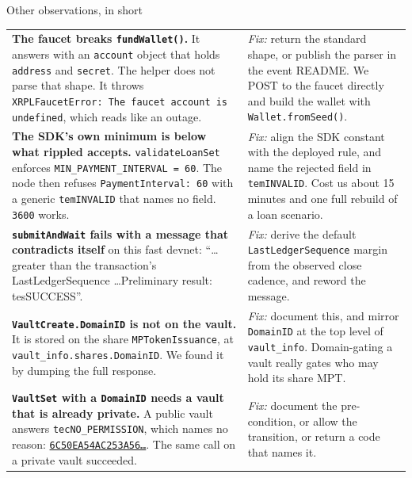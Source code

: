 \documentclass[10pt,a4paper]{article}
\newcommand{\txs}[2]{\href{https://custom.xrpl.org/lending-hackathon.dev.ripplex.io:51233/transactions/#1}{\texttt{\fontsize{7.4}{9}\selectfont #2\ldots}}}
\begin{document}
{\displayfont\fontsize{13}{16}\selectfont\color{forest}Other observations, in short\par}
\nopagebreak\vspace{1mm}
\nopagebreak\noindent\begin{longtable}{@{}>{\fontsize{8.6}{11}\selectfont\RaggedRight}p{58mm}@{\hspace{5mm}}>{\fontsize{8.6}{11}\selectfont\RaggedRight}p{105mm}@{}}
\textbf{The faucet breaks \texttt{fundWallet()}.} It answers with an \texttt{account} object that holds \texttt{address} and \texttt{secret}. The helper does not parse that shape. It throws \texttt{XRPLFaucetError: The faucet account is undefined}, which reads like an outage. & \emph{Fix:} return the standard shape, or publish the parser in the event README. We POST to the faucet directly and build the wallet with \texttt{Wallet.fromSeed()}.\\[3pt]
\textbf{The SDK's own minimum is below what rippled accepts.} \texttt{validateLoanSet} enforces \texttt{MIN\_PAYMENT\_INTERVAL = 60}. The node then refuses \texttt{PaymentInterval: 60} with a generic \texttt{temINVALID} that names no field. \texttt{3600} works. & \emph{Fix:} align the SDK constant with the deployed rule, and name the rejected field in \texttt{temINVALID}. Cost us about 15 minutes and one full rebuild of a loan scenario.\\[3pt]
\textbf{\texttt{submitAndWait} fails with a message that contradicts itself} on this fast devnet: ``\ldots greater than the transaction's LastLedgerSequence \ldots Preliminary result: tesSUCCESS''. & \emph{Fix:} derive the default \texttt{LastLedgerSequence} margin from the observed close cadence, and reword the message.\\[3pt]
\textbf{\texttt{VaultCreate.DomainID} is not on the vault.} It is stored on the share \texttt{MPTokenIssuance}, at \texttt{vault\_info.shares.DomainID}. We found it by dumping the full response. & \emph{Fix:} document this, and mirror \texttt{DomainID} at the top level of \texttt{vault\_info}. Domain-gating a vault really gates who may hold its share MPT.\\[3pt]
\textbf{\texttt{VaultSet} with a \texttt{DomainID} needs a vault that is already private.} A public vault answers \texttt{tecNO\_PERMISSION}, which names no reason: \txs{6C50EA54AC253A56B94E77AFE8B6CD06E64C9A171700523767CC5A02BE783E9C}{6C50EA54AC253A56}. The same call on a private vault succeeded. & \emph{Fix:} document the pre-condition, or allow the transition, or return a code that names it.\\[3pt]

\end{longtable}
\end{document}
